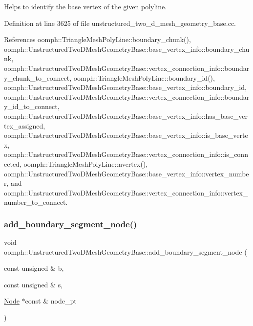 Helps to identify the base vertex of the given polyline. 



Definition at line 3625 of file unstructured\+\_\+two\+\_\+d\+\_\+mesh\+\_\+geometry\+\_\+base.\+cc.



References oomph\+::\+Triangle\+Mesh\+Poly\+Line\+::boundary\+\_\+chunk(), oomph\+::\+Unstructured\+Two\+D\+Mesh\+Geometry\+Base\+::base\+\_\+vertex\+\_\+info\+::boundary\+\_\+chunk, oomph\+::\+Unstructured\+Two\+D\+Mesh\+Geometry\+Base\+::vertex\+\_\+connection\+\_\+info\+::boundary\+\_\+chunk\+\_\+to\+\_\+connect, oomph\+::\+Triangle\+Mesh\+Poly\+Line\+::boundary\+\_\+id(), oomph\+::\+Unstructured\+Two\+D\+Mesh\+Geometry\+Base\+::base\+\_\+vertex\+\_\+info\+::boundary\+\_\+id, oomph\+::\+Unstructured\+Two\+D\+Mesh\+Geometry\+Base\+::vertex\+\_\+connection\+\_\+info\+::boundary\+\_\+id\+\_\+to\+\_\+connect, oomph\+::\+Unstructured\+Two\+D\+Mesh\+Geometry\+Base\+::base\+\_\+vertex\+\_\+info\+::has\+\_\+base\+\_\+vertex\+\_\+assigned, oomph\+::\+Unstructured\+Two\+D\+Mesh\+Geometry\+Base\+::base\+\_\+vertex\+\_\+info\+::is\+\_\+base\+\_\+vertex, oomph\+::\+Unstructured\+Two\+D\+Mesh\+Geometry\+Base\+::vertex\+\_\+connection\+\_\+info\+::is\+\_\+connected, oomph\+::\+Triangle\+Mesh\+Poly\+Line\+::nvertex(), oomph\+::\+Unstructured\+Two\+D\+Mesh\+Geometry\+Base\+::base\+\_\+vertex\+\_\+info\+::vertex\+\_\+number, and oomph\+::\+Unstructured\+Two\+D\+Mesh\+Geometry\+Base\+::vertex\+\_\+connection\+\_\+info\+::vertex\+\_\+number\+\_\+to\+\_\+connect.

\mbox{\label{classoomph_1_1UnstructuredTwoDMeshGeometryBase_a967d6bf715fca6ed9d8cd9a38382990b}} 
\subsubsection{\texorpdfstring{add\+\_\+boundary\+\_\+segment\+\_\+node()}{add\_boundary\_segment\_node()}}
{\footnotesize\ttfamily void oomph\+::\+Unstructured\+Two\+D\+Mesh\+Geometry\+Base\+::add\+\_\+boundary\+\_\+segment\+\_\+node (\begin{DoxyParamCaption}\item[{const unsigned \&}]{b,  }\item[{const unsigned \&}]{s,  }\item[{\hyperlink{classoomph_1_1Node}{Node} $\ast$const \&}]{node\+\_\+pt }\end{DoxyParamCaption})\hspace{0.3cm}{\ttfamily [inline]}}

